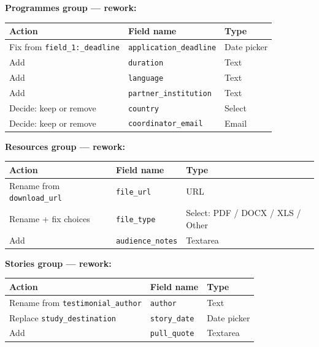 \documentclass[12pt,a4paper]{article}
\begin{document}
\vspace{0.8em}
\noindent\textbf{Programmes group --- rework:}

\vspace{0.4em}
\begin{tabular}{@{}p{3.5cm}p{3.5cm}p{5.3cm}@{}}
\toprule
\rowcolor{uvtLightBlue}
\textbf{Action} & \textbf{Field name} & \textbf{Type} \\
\midrule
Fix from \texttt{field\_1:\_deadline} & \texttt{application\_deadline} & Date picker \\
Add & \texttt{duration} & Text \\
Add & \texttt{language} & Text \\
Add & \texttt{partner\_institution} & Text \\
Decide: keep or remove & \texttt{country} & Select \\
Decide: keep or remove & \texttt{coordinator\_email} & Email \\
\bottomrule
\end{tabular}

\vspace{0.8em}
\noindent\textbf{Resources group --- rework:}

\vspace{0.4em}
\begin{tabular}{@{}p{3.5cm}p{3.5cm}p{5.3cm}@{}}
\toprule
\rowcolor{uvtLightBlue}
\textbf{Action} & \textbf{Field name} & \textbf{Type} \\
\midrule
Rename from \texttt{download\_url} & \texttt{file\_url} & URL \\
Rename + fix choices & \texttt{file\_type} & Select: PDF / DOCX / XLS / Other \\
Add & \texttt{audience\_notes} & Textarea \\
\bottomrule
\end{tabular}

\vspace{0.8em}
\noindent\textbf{Stories group --- rework:}

\vspace{0.4em}
\begin{tabular}{@{}p{3.5cm}p{3.5cm}p{5.3cm}@{}}
\toprule
\rowcolor{uvtLightBlue}
\textbf{Action} & \textbf{Field name} & \textbf{Type} \\
\midrule
Rename from \texttt{testimonial\_author} & \texttt{author} & Text \\
Replace \texttt{study\_destination} & \texttt{story\_date} & Date picker \\
Add & \texttt{pull\_quote} & Textarea \\
\bottomrule
\end{tabular}
\end{document}
